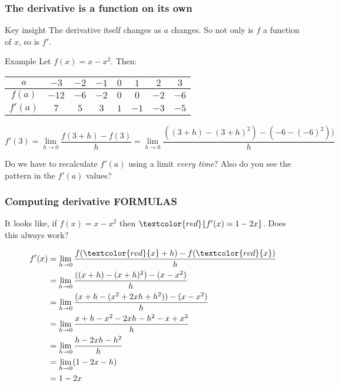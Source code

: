 \documentclass{beamer}
\begin{document}
\begin{frame}
    \frametitle{The derivative is a function on its own}

    \begin{block}{Key insight}
        The derivative itself changes as $a$ changes. So \alert{not only is $f$ a function of $x$, so is $f'$.}
    \end{block}
    
    \begin{exampleblock}{Example}
        Let $f(x) = x-x^2$. Then: 

        \begin{tabular}{c||c|c|c|c|c|c|c}
            $a$ & $-3$ & $-2$ & $-1$ & $0$ & $1$ & $2$ & $3$ \\ \hline
            $f(a)$ & $-12$ & $-6$ & $-2$ & $0$ & $0$ & $-2$ & $-6$ \\ \hline
            $f'(a)$ & $7$ & $5$ & $3$ & $1$ & $-1$ & $-3$ & $-5$ 
        \end{tabular}

    \end{exampleblock}

    $$f'(3) = \lim_{h \to 0} \frac{f(3+h)-f(3)}{h} = \lim_{h \to 0} \frac{((3+h) - (3+h)^2)-(-6-(-6)^2))}{h}$$

    \alert{Do we have to recalculate $f'(a)$ using a limit \emph{every time}?} Also do you see the pattern in the $f'(a)$ values? 

\end{frame}


\begin{frame}
    \frametitle{Computing derivative FORMULAS}

    It looks like, if $f(x) = x-x^2$ then $\textcolor{red}{f'(x) = 1-2x}$. Does this always work? \pause 

    \begin{align*}
        f'(x) &= \lim_{h \to 0} \frac{f(\textcolor{red}{x}+h) - f(\textcolor{red}{x})}{h} \\ 
        &= \lim_{h \to 0} \frac{((x+h) - (x+h)^2)-(x - x^2)}{h} \\
        &= \lim_{h \to 0} \frac{(x+h - (x^2 + 2xh + h^2)) - (x - x^2)}{h} \\
        &= \lim_{h \to 0} \frac{x+h - x^2 - 2xh - h^2 -x + x^2}{h} \\
        &= \lim_{h \to 0} \frac{h-2xh - h^2}{h} \\
        &= \lim_{h \to 0} (1 - 2x - h) \\
        &= 1-2x
    \end{align*}

\end{frame}
\end{document}
